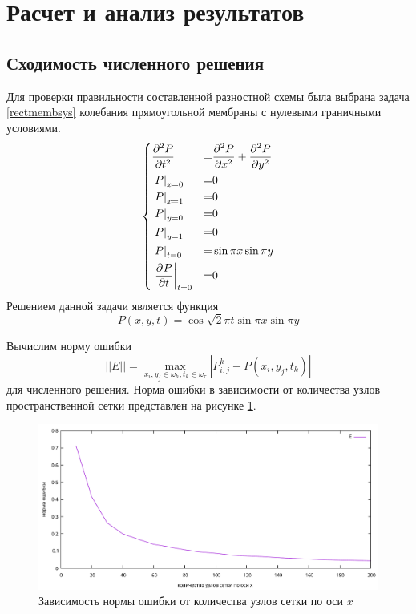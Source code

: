 \documentclass[a4paper, fontsize=14pt]{article}
\begin{document}
\section{Расчет и анализ результатов}
\subsection{Сходимость численного решения}
	Для проверки правильности составленной разностной схемы была выбрана задача \ref{rectmembsys} колебания прямоугольной
мембраны с нулевыми граничными условиями.
\begin{equation}
\label{rectmembsys}
	\left\{
	\begin{aligned}
		&\diff[2]{P}{t}          &=& \diff[2]{P}{x} + \diff[2]{P}{y} \\
		&\subs{x=0}{P}           &=& 0\\
		&\subs{x=1}{P}           &=& 0\\
		&\subs{y=0}{P}           &=& 0\\
		&\subs{y=1}{P}           &=& 0\\
		&\subs{t=0}{P}           &=& \sin \pi x \sin \pi y\\
		&\subs{t=0}{\diff{P}{t}} &=& 0\\
	\end{aligned}
	\right.
\end{equation}
Решением данной задачи является функция $$P(x,y,t) = \cos \sqrt{2}\pi t \sin \pi x \sin \pi y$$

Вычислим норму ошибки $$||E|| = \max\limits_{x_i,y_j \in \omega_h, t_k \in
\omega_\tau} |P^k_{i,j} - P(x_i,y_j,t_k)|$$ для численного решения. Норма ошибки в зависимости от
количества узлов пространственной сетки представлен на рисунке \ref{errgraph}.
\begin{figure}[h]
	\centering
	\includegraphics[width=1\columnwidth]{err-graph}
	\caption{Зависимость нормы ошибки от количества узлов сетки по оси $x$}
	\label{errgraph}
\end{figure}
\end{document}
